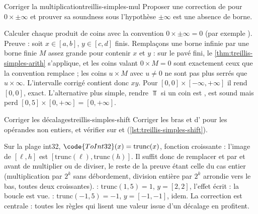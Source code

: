 \begin{exercice}{Corriger la multiplication}{treillis-simples-mul}
  Proposer une correction de  pour $0 \times \pm\infty$
  et prouver sa soundness sous l'hypothèse \og $\pm\infty$ est une absence de
  borne\fg{}.
\end{exercice}
\begin{solution}
  Calculer chaque produit de coins avec la convention $0 \times \pm\infty =
  0$ (par exemple ). Preuve : soit
  $x \in [a,b]$, $y \in [c,d]$ finis. Remplaçons une borne infinie par une
  borne finie $M$ assez grande pour contenir $x$ et $y$ : sur le pavé fini,
  le \cref{thm:treillis-simples-arith} s'applique, et les coins valant
  $0 \times M = 0$ sont exactement ceux que la convention remplace ; les coins
  $u \times M$ avec $u \neq 0$ ne sont pas plus serrés que $u \times \infty$.
  L'intervalle corrigé contient donc $xy$. Pour $[0,0] \times
  [-\infty,+\infty]$ il rend $[0,0]$, exact. L'alternative plus simple,
  rendre $\Top$ si un coin est , est sound mais perd
  $[0,5] \times [0,+\infty] = [0,+\infty]$.
\end{solution}

\begin{exercice}{Corriger les décalages}{treillis-simples-shift}
  Corriger les bras  et  d' pour les
  opérandes non entiers, et vérifier sur  et 
  (\cref{lst:treillis-simples-shift}).
\end{exercice}
\begin{solution}
  Sur la plage int32, $\code{ToInt32}(x) = \mathrm{trunc}(x)$, fonction
  croissante : l'image de $[\ell, h]$ est $[\mathrm{trunc}(\ell),
  \mathrm{trunc}(h)]$. Il suffit donc de remplacer  et
   par  et  avant de
  multiplier ou de diviser, le reste de la preuve étant celle du cas entier
  (multiplication par $2^k$ sans débordement, division entière par $2^k$
  arrondie vers le bas, toutes deux croissantes).  :
  $\mathrm{trunc}(1{,}5) = 1$, $y = [2,2]$, l'effet écrit  :
  la boucle est vue.  : $\mathrm{trunc}(-1{,}5) = -1$,
  $y = [-1,-1]$, idem. La correction est centrale : toutes les règles qui
  lisent une valeur issue d'un décalage en profitent.
\end{solution}
